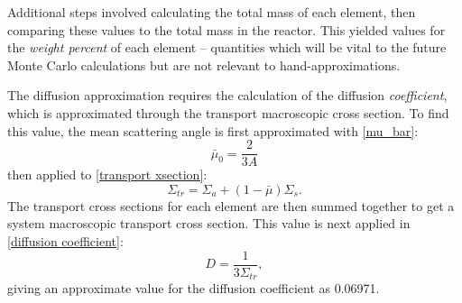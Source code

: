 \documentclass{anstrans}
\begin{document}
    Additional steps involved calculating the total mass of each element, then comparing these values to the total mass in the reactor.
    This yielded values for the \textit{weight percent} of each element -- quantities which will be vital to the future Monte Carlo calculations but are not relevant to hand-approximations.

    The diffusion approximation requires the calculation of the diffusion \textit{coefficient}, which is approximated through the transport macroscopic cross section.
    To find this value, the mean scattering angle is first approximated with \cref{mu_bar}:
    \begin{equation}
        \label{mu_bar}
        \bar{\mu}_0 = \frac{2}{3A}
    \end{equation}
    then applied to \cref{transport xsection}:
    \begin{equation}
        \label{transport xsection}
        \Sigma_{tr} = \Sigma_a + (1-\bar{\mu})\Sigma_s.
    \end{equation}
    The transport cross sections for each element are then summed together to get a system macroscopic transport cross section.
    This value is next applied in \cref{diffusion coefficient}:
    \begin{equation}
        \label{diffusion coefficient}
        D = \frac{1}{3\Sigma_{tr}},
    \end{equation}
    giving an approximate value for the diffusion coefficient as 0.06971.
\end{document}
